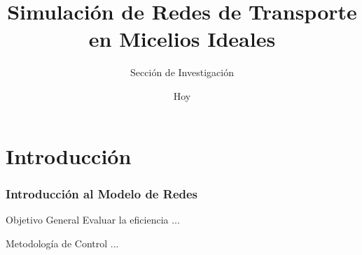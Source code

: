 \documentclass{article}
\title{Simulación de Redes de Transporte en Micelios Ideales}
\author{Sección de Investigación}
\date{Hoy}
\begin{document}

\section{Introducción}


\begin{frame}
\frametitle{Introducción al Modelo de Redes}

\begin{block}{Objetivo General}
    Evaluar la eficiencia ...
\end{block}

\begin{block}{Metodología de Control}
    ...
\end{block}
\end{frame}
\end{document}
